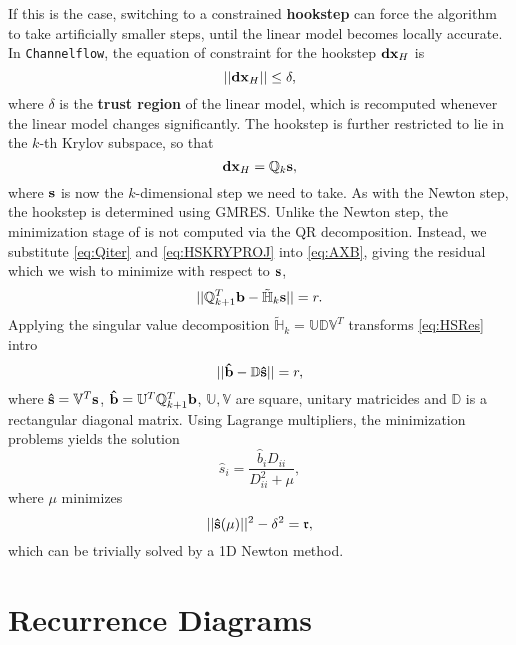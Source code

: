  If this is the case, switching to a constrained {\bf hookstep} can force the algorithm to take artificially smaller steps, until the linear model becomes locally accurate. In {\tt Channelflow}, the equation of constraint for the hookstep $\mathbf{dx}_H$ is 
 \begin{equation}\label{eq:HSEOC}
 ||\mathbf{dx}_H|| \leq \delta,
 \end{equation}
 where $\delta$ is the {\bf trust region} of the linear model, which is recomputed whenever the linear model changes significantly. The hookstep is further restricted to lie in the $k$-th Krylov subspace, so that 
 \begin{equation}\label{eq:HSKRYPROJ}
 \mathbf{dx}_H = \mathbb{Q}_{k}\mathbf{s},
 \end{equation} 
 where $\mathbf{s}$ is now the $k$-dimensional step we need to take. As with the Newton step, the hookstep is determined using GMRES. Unlike the Newton step, the minimization stage of  is not computed via the QR decomposition. Instead, we substitute \eqref{eq:Qiter} and \eqref{eq:HSKRYPROJ} into \eqref{eq:AXB}, giving the residual which we wish to minimize with respect to $\mathbf{s}$,
 \begin{equation}\label{eq:HSRes}
 ||\mathbb{Q}^{T}_{k+1}\mathbf{b}-\mathbb{\tilde{H}}_k\mathbf{s}|| = r.
 \end{equation}
 Applying the singular value decomposition $\mathbb{\tilde{H}}_k = \mathbb{U}\mathbb{D}\mathbb{V}^T$ transforms \eqref{eq:HSRes} intro
 \begin{equation}
 || \mathbf{\hat{b}}-\mathbb{D}\mathbf{\hat{s}} || = r,
 \end{equation}
 where $\mathbf{\hat{s}} = \mathbb{V}^T\mathbf{s}$, $\mathbf{\hat{b}} = \mathbb{U}^T\mathbb{Q}^T_{k+1}\mathbf{b}$, $\mathbb{U},\mathbb{V}$ are square, unitary matricides and $\mathbb{D}$ is a rectangular diagonal matrix. Using Lagrange multipliers, the minimization problems yields the solution
 \begin{equation}
 {\hat{s}}_i = \frac{{\hat{b}}_i {D}_{ii}}{{D}_{ii}^2 + \mu},
 \end{equation}
 where $\mu$ minimizes 
 \begin{equation}
 ||\mathbf{\hat{s}}(\mu)||^2 - \delta^2 = \mathfrak{r},
 \end{equation}
 which can be trivially solved by a 1D Newton method. 
 
 \section{Recurrence Diagrams}
 

